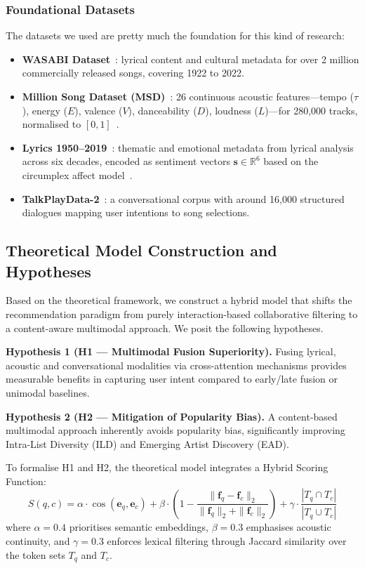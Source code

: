 \documentclass[]{ceurart}
\newcommand{\vect}[1]{\boldsymbol{#1}}
\newcommand{\Real}{\mathbb{R}}
\newcommand{\cosine}{\operatorname{cos}}
\begin{document}
\subsubsection{Foundational Datasets}
The datasets we used are pretty much the foundation for this kind of research:
\begin{itemize}
  \item \textbf{WASABI Dataset}~\cite{buffa2021wasabi}: lyrical content and
    cultural metadata for over 2 million commercially released songs, covering
    1922 to 2022.
  \item \textbf{Million Song Dataset (MSD)}~\cite{bertin2011million}: 26
    continuous acoustic features---tempo ($\tau$), energy ($E$), valence ($V$),
    danceability ($D$), loudness ($L$)---for 280,000 tracks, normalised to
    $[0,1]$~\cite{spotify2023audio}.
  \item \textbf{Lyrics 1950--2019}~\cite{moura2020lyrics}: thematic and
    emotional metadata from lyrical analysis across six decades, encoded as
    sentiment vectors $\vect{s}\in\Real^{6}$ based on the circumplex affect
    model~\cite{russell1980circumplex}.
  \item \textbf{TalkPlayData-2}~\cite{choi2025talkplaydata2}: a conversational
    corpus with around 16,000 structured dialogues mapping user intentions to
    song selections.
\end{itemize}

\subsection{Theoretical Model Construction and Hypotheses}
\label{sec:hypotheses}

Based on the theoretical framework, we construct a hybrid model that shifts the
recommendation paradigm from purely interaction-based collaborative filtering
to a content-aware multimodal approach. We posit the following hypotheses.

\textbf{Hypothesis 1 (H1 --- Multimodal Fusion Superiority).} Fusing lyrical,
acoustic and conversational modalities via cross-attention mechanisms provides
measurable benefits in capturing user intent compared to early/late fusion or
unimodal baselines.

\textbf{Hypothesis 2 (H2 --- Mitigation of Popularity Bias).} A content-based
multimodal approach inherently avoids popularity bias, significantly improving
Intra-List Diversity (ILD) and Emerging Artist Discovery (EAD).

To formalise H1 and H2, the theoretical model integrates a Hybrid Scoring
Function:
\begin{equation}
S(q,c) = \alpha \cdot \cosine(\vect{e}_q, \vect{e}_c)
       + \beta \cdot \left(1 - \frac{\|\vect{f}_q - \vect{f}_c\|_2}
       {\|\vect{f}_q\|_2 + \|\vect{f}_c\|_2}\right)
       + \gamma \cdot \frac{|T_q \cap T_c|}{|T_q \cup T_c|}
\label{eq:scoring}
\end{equation}
where $\alpha=0.4$ prioritises semantic embeddings, $\beta=0.3$ emphasises
acoustic continuity, and $\gamma=0.3$ enforces lexical filtering through
Jaccard similarity over the token sets $T_q$ and $T_c$.
\end{document}
